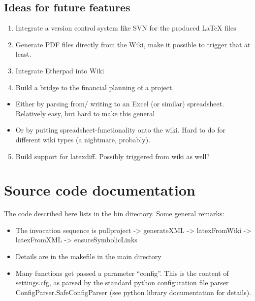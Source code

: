 \documentclass[a4paper,10pt,english]{sphinxmanual}
\begin{document}
\section{Ideas for future features}
\label{openissues:ideas-for-future-features}\begin{enumerate}
\item {} 
Integrate a version control system like SVN for
the produced LaTeX files

\item {} 
Generate PDF files directly from the Wiki, make
it possible to trigger that at least.

\item {} 
Integrate Etherpad into Wiki

\item {} 
Build a bridge to the financial planning of a
project.

\end{enumerate}
\begin{itemize}
\item {} 
Either by parsing from/ writing to an Excel
(or similar) spreadsheet. Relatively easy, but
hard to make this general

\item {} 
Or by putting spreadsheet-functionality onto
the wiki. Hard to do for different wiki types
(a nightmare, probably).

\end{itemize}
\begin{enumerate}
\setcounter{enumi}{4}
\item {} 
Build support for latexdiff. Possibly triggered
from wiki as well?

\end{enumerate}


\chapter{Source code documentation}
\label{sourcecodedoc::doc}\label{sourcecodedoc:source-code-documentation}
The code described here lists in the bin directory. Some general remarks:
\begin{itemize}
\item {} 
The invocation sequence is pullproject -\textgreater{} generateXML -\textgreater{} latexFromWiki -\textgreater{} latexFromXML -\textgreater{} ensureSymbolicLinks

\item {} 
Details are in the makefile in the main directory

\item {} 
Many functions get passed a parameter ``config''. This is the content of settings.cfg, as parsed by the standard python configuration file parser ConfigParser.SafeConfigParser (see python library documentation for details).

\end{itemize}
\end{document}
